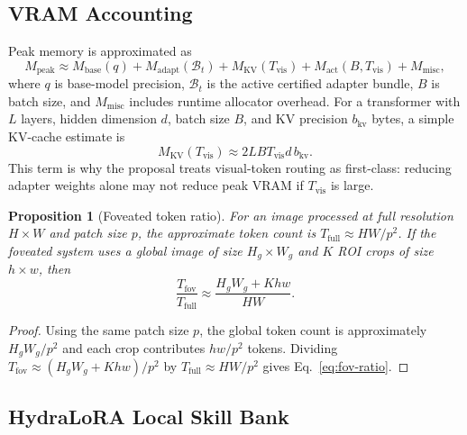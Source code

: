 \documentclass[11pt]{article}
\newtheorem{proposition}{Proposition}
\begin{document}
\subsection{VRAM Accounting}

Peak memory is approximated as
\begin{equation}
  M_{\mathrm{peak}}
  \approx
  M_{\mathrm{base}}(q)
  + M_{\mathrm{adapt}}(\mathcal{B}_t)
  + M_{\mathrm{KV}}(T_{\mathrm{vis}})
  + M_{\mathrm{act}}(B,T_{\mathrm{vis}})
  + M_{\mathrm{misc}},
  \label{eq:vram}
\end{equation}
where $q$ is base-model precision, $\mathcal{B}_t$ is the active certified adapter bundle, $B$ is batch size, and $M_{\mathrm{misc}}$ includes runtime allocator overhead.
For a transformer with $L$ layers, hidden dimension $d$, batch size $B$, and KV precision $b_{\mathrm{kv}}$ bytes, a simple KV-cache estimate is
\begin{equation}
  M_{\mathrm{KV}}(T_{\mathrm{vis}})
  \approx
  2 L B T_{\mathrm{vis}} d\, b_{\mathrm{kv}}.
  \label{eq:kv}
\end{equation}
This term is why the proposal treats visual-token routing as first-class: reducing adapter weights alone may not reduce peak VRAM if $T_{\mathrm{vis}}$ is large.

\begin{proposition}[Foveated token ratio]
For an image processed at full resolution $H\times W$ and patch size $p$, the approximate token count is $T_{\mathrm{full}}\approx HW/p^2$.
If the foveated system uses a global image of size $H_g\times W_g$ and $K$ ROI crops of size $h\times w$, then
\begin{equation}
  \frac{T_{\mathrm{fov}}}{T_{\mathrm{full}}}
  \approx
  \frac{H_gW_g + Khw}{HW}.
  \label{eq:fov-ratio}
\end{equation}
\end{proposition}

\begin{proof}
Using the same patch size $p$, the global token count is approximately $H_gW_g/p^2$ and each crop contributes $hw/p^2$ tokens.
Dividing $T_{\mathrm{fov}}\approx (H_gW_g+Khw)/p^2$ by $T_{\mathrm{full}}\approx HW/p^2$ gives Eq.~\ref{eq:fov-ratio}.
\end{proof}

\subsection{HydraLoRA Local Skill Bank}
\end{document}
